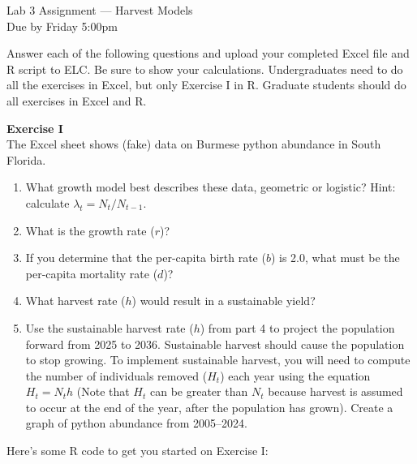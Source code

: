 \documentclass[12pt]{article}\usepackage[]{graphicx}\usepackage[]{xcolor}
\begin{document}
{
  \Large
  \centering
  Lab 3 Assignment --- Harvest Models \\
  Due by Friday 5:00pm \par
}

Answer each of the following questions and upload your completed Excel
file and R script to ELC. Be sure to show your calculations. Undergraduates
need to do all the exercises in Excel, but only Exercise I in
R. Graduate students should do all exercises in Excel and R.  

\vspace{12pt}

{\bf Exercise I \\}
The Excel sheet shows (fake) data on Burmese python abundance in South Florida.
\begin{enumerate}
  \item What growth model best describes these data, geometric or
    logistic?  Hint: calculate $\lambda_t = N_t/N_{t-1}$.
  \item What is the growth rate ($r$)?
  \item If you determine that the per-capita birth rate ($b$) is 2.0,
    what must be the per-capita mortality rate ($d$)?
  \item What harvest rate ($h$) would result in a sustainable yield?
  \item Use the sustainable harvest rate ($h$) from part 4 to project
    the population forward from 2025 to 2036. Sustainable harvest
    should cause the population to stop growing. To implement
    sustainable harvest, you will need to compute the number of
    individuals removed ($H_t$) each year using the equation
    $H_t=N_{t}h$ (Note that $H_t$ can be greater than $N_t$ because
    harvest is assumed to occur at the end of the year, after the 
    population has grown). Create a graph of python abundance from 
    2005--2024.  
\end{enumerate}

\vspace{24pt}

Here's some R code to get you started on Exercise I:
\end{document}
